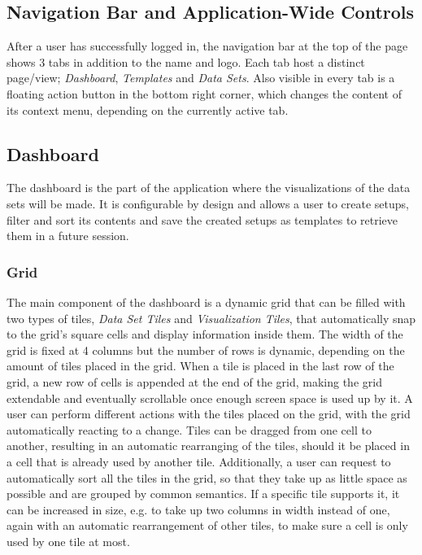 \subsection{Navigation Bar and Application-Wide Controls}
After a user has successfully logged in, the navigation bar at the top of the page shows 3 tabs in addition to the name and logo. Each tab host a distinct page/view; \emph{Dashboard}, \emph{Templates} and \emph{Data Sets}. Also visible in every tab is a floating action button in the bottom right corner, which changes the content of its context menu, depending on the currently active tab.

\subsection{Dashboard}
The dashboard is the part of the application where the visualizations of the data sets will be made. It is configurable by design and allows a user to create setups, filter and sort its contents and save the created setups as templates to retrieve them in a future session.

\subsubsection{Grid}
The main component of the dashboard is a dynamic grid that  can be filled with two types of tiles, \emph{Data Set Tiles} and \emph{Visualization Tiles}, that automatically snap to the grid's square cells and display information inside them. The width of the grid is fixed at 4 columns but the number of rows is dynamic, depending on the amount of tiles placed in the grid. When a tile is placed in the last row of the grid, a new row of cells is appended at the end of the grid, making the grid extendable and eventually scrollable once enough screen space is used up by it.
A user can perform different actions with the tiles placed on the grid, with the grid automatically reacting to a change. Tiles can be dragged from one cell to another, resulting in an automatic rearranging of the tiles, should it be placed in a cell that is already used by another tile. Additionally, a user can request to automatically sort all the tiles in the grid, so that they take up as little space as possible and are grouped by common semantics. If a specific tile supports it, it can be increased in size, e.g. to take up two columns in width instead of one, again with an automatic rearrangement of other tiles, to make sure a cell is only used by one tile at most.

